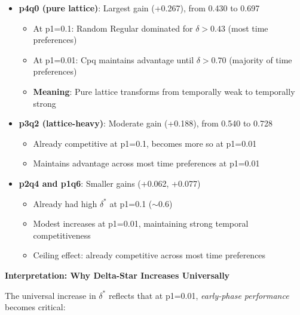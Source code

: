 \documentclass[12pt,a4paper]{article}
\begin{document}
\begin{itemize}
    \item \textbf{p4q0 (pure lattice)}: Largest gain (+0.267), from 0.430 to 0.697
    \begin{itemize}
        \item At p1=0.1: Random Regular dominated for $\delta > 0.43$ (most time preferences)
        \item At p1=0.01: Cpq maintains advantage until $\delta > 0.70$ (majority of time preferences)
        \item \textbf{Meaning}: Pure lattice transforms from temporally weak to temporally strong
    \end{itemize}

    \item \textbf{p3q2 (lattice-heavy)}: Moderate gain (+0.188), from 0.540 to 0.728
    \begin{itemize}
        \item Already competitive at p1=0.1, becomes more so at p1=0.01
        \item Maintains advantage across most time preferences at p1=0.01
    \end{itemize}

    \item \textbf{p2q4 and p1q6}: Smaller gains (+0.062, +0.077)
    \begin{itemize}
        \item Already had high $\delta^*$ at p1=0.1 ($\sim$0.6)
        \item Modest increases at p1=0.01, maintaining strong temporal competitiveness
        \item Ceiling effect: already competitive across most time preferences
    \end{itemize}
\end{itemize}

\textbf{Interpretation: Why Delta-Star Increases Universally}

The universal increase in $\delta^*$ reflects that at p1=0.01, \textit{early-phase performance} becomes critical:
\end{document}
